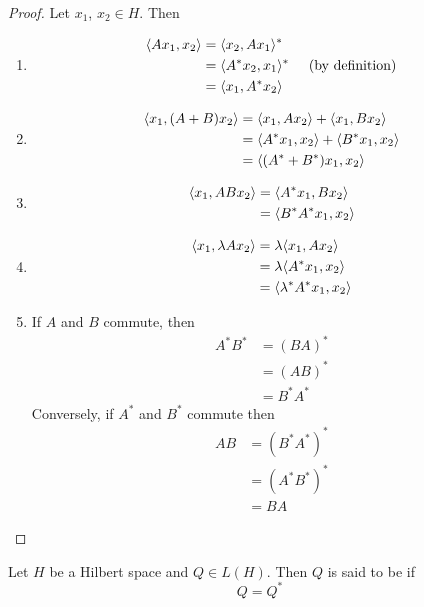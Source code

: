 \documentclass{book}
\begin{document}
\begin{proof} Let $x_1$, $x_2 \in H$. Then
	\begin{enumerate}
		\item 
		\begin{align*}
			\langle A x_1 , x_2 \rangle
			&= \langle x_2 , A x_1 \rangle^*\\
			&= \langle A^{*}x_2 ,  x_1 \rangle^* \hspace{.5cm} \text{(by definition)}\\
			&= \langle  x_1 , A^{*}x_2 \rangle
		\end{align*}
		\item 
		\begin{align*}
			\langle x_1 , (A+B) x_2 \rangle 
			&= \langle x_1 , A x_2 \rangle + \langle x_1 , B x_2 \rangle \\
			&= \langle A^{*} x_1 , x_2 \rangle + \langle B^{*} x_1 , x_2 \rangle \\
			&= \langle (A^{*} + B^{*})  x_1 , x_2 \rangle  \\
		\end{align*}
		\item 
		\begin{align*}
			\langle x_1 , AB x_2 \rangle  
			&= \langle A^{*}x_1 , B x_2 \rangle \\
			&= \langle B^{*} A^{*} x_1 , x_2 \rangle 
		\end{align*}
		\item 
		\begin{align*}
			\langle x_1 , \lambda A x_2 \rangle 
			&= \lambda \langle x_1 , A x_2 \rangle \\
			&= \lambda \langle A^{*}x_1 , x_2 \rangle \\
			&= \langle \lambda^* A^{*} x_1 , x_2 \rangle 
		\end{align*}
		\item If $A$ and $B$ commute, then 
		\begin{align*}
			A^{*}B^{*}
			&= (BA)^{*} \\
			&= (AB)^{*} \\
			&= B^{*}A^{*}
		\end{align*}
		Conversely, if $A^{*}$ and $B^{*}$ commute then 
		\begin{align*}
			AB
			&= (B^{*}A^{*})^{*} \\
			&= (A^{*}B^{*})^{*} \\
			&= BA
		\end{align*}
	\end{enumerate}
\end{proof}

\begin{defn} \ld{}
	Let $H$ be a Hilbert space and $Q \in L(H)$. Then $Q$ is said to be  if $$Q = Q^{*}$$
\end{defn}
\end{document}
